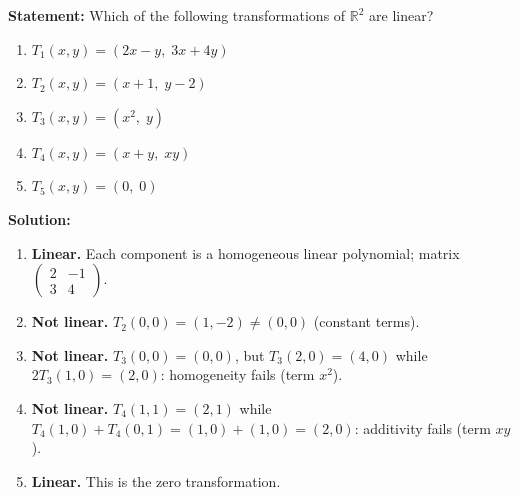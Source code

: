 \documentclass[11pt]{article}
\begin{document}
\begin{exoresolu}
\noindent\textbf{Statement:} Which of the following transformations of $\mathbb{R}^2$ are linear?
\begin{enumerate}
    \item $T_1(x,y) = (2x - y,\; 3x + 4y)$
    \item $T_2(x,y) = (x+1,\; y-2)$
    \item $T_3(x,y) = (x^2,\; y)$
    \item $T_4(x,y) = (x+y,\; xy)$
    \item $T_5(x,y) = (0,\; 0)$
\end{enumerate}
\tcblower
\noindent\textbf{Solution:}
\begin{enumerate}
    \item \textbf{Linear.} Each component is a homogeneous linear polynomial; matrix $\begin{pmatrix}2&-1\\3&4\end{pmatrix}$.
    \item \textbf{Not linear.} $T_2(0,0) = (1,-2) \neq (0,0)$ (constant terms).
    \item \textbf{Not linear.} $T_3(0,0)=(0,0)$, but $T_3(2,0)=(4,0)$ while $2T_3(1,0)=(2,0)$: homogeneity fails (term $x^2$).
    \item \textbf{Not linear.} $T_4(1,1)=(2,1)$ while $T_4(1,0)+T_4(0,1)=(1,0)+(1,0)=(2,0)$: additivity fails (term $xy$).
    \item \textbf{Linear.} This is the zero transformation.
\end{enumerate}
\end{exoresolu}
\end{document}
